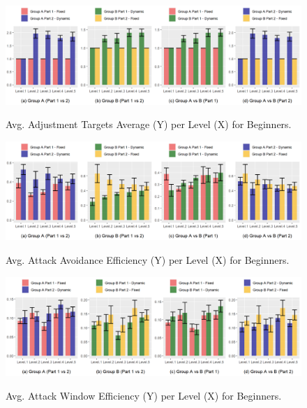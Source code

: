 \begin{figure}
    \begin{center}
    \caption{Avg. Adjustment Targets Average (Y) per Level (X) for Beginners.}
        \includegraphics[width=34em]{figures/adjustment_target_level-beginner_players.png}
        \label{fig:result-metric-beginners-adjustment-target-level}
    \end{center}
\end{figure}

\begin{figure}[!ht]
    \begin{center}
    \caption{Avg. Attack Avoidance Efficiency (Y) per Level (X) for Beginners.}
        \includegraphics[width=34em]{figures/attack_avoidance_efficiency-beginner_players.png}
        \label{fig:result-metric-beginners-attack-avoidance-efficiency}
    \end{center}
\end{figure}

\begin{figure}[!ht]
    \begin{center}
    \caption{Avg. Attack Window Efficiency (Y) per Level (X) for Beginners.}
        \includegraphics[width=34em]{figures/attack_window_efficiency-beginner_players.png}
        \label{fig:result-metric-beginners-attack-window-efficiency}
    \end{center}
\end{figure}

